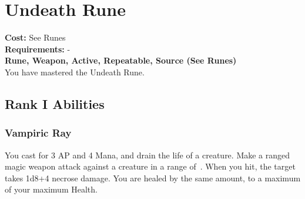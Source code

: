 \section{Undeath Rune}\label{rune:undeath}
\textbf{Cost:} See Runes\\
\textbf{Requirements:} -\\
\textbf{Rune, Weapon, Active, Repeatable, Source (See Runes)}\\
You have mastered the Undeath Rune.

\subsection{Rank I Abilities}

\subsubsection{Vampiric Ray}
You cast for 3 AP and 4 Mana, and drain the life of a creature.
Make a ranged magic weapon attack against a creature in a range of~.
When you hit, the target takes 1d8+4 necrose damage.
You are healed by the same amount, to a maximum of your maximum Health.